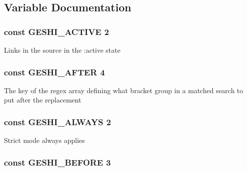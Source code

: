 \subsection{Variable Documentation}
\hypertarget{geshi_8php_a4d7a4c7dd9b37d0ad87e7f608aceb730}{
\subsubsection[{G\-E\-S\-H\-I\-\_\-\-A\-C\-T\-I\-V\-E}]{\setlength{\rightskip}{0pt plus 5cm}const G\-E\-S\-H\-I\-\_\-\-A\-C\-T\-I\-V\-E 2}}\label{geshi_8php_a4d7a4c7dd9b37d0ad87e7f608aceb730}
Links in the source in the \-:active state \hypertarget{geshi_8php_a9af1ed4c363ea643560ad9151f54d569}{
\subsubsection[{G\-E\-S\-H\-I\-\_\-\-A\-F\-T\-E\-R}]{\setlength{\rightskip}{0pt plus 5cm}const G\-E\-S\-H\-I\-\_\-\-A\-F\-T\-E\-R 4}}\label{geshi_8php_a9af1ed4c363ea643560ad9151f54d569}
The key of the regex array defining what bracket group in a matched search to put after the replacement \hypertarget{geshi_8php_ac99f8d1c5e483d980b3a5898e63c5ece}{
\subsubsection[{G\-E\-S\-H\-I\-\_\-\-A\-L\-W\-A\-Y\-S}]{\setlength{\rightskip}{0pt plus 5cm}const G\-E\-S\-H\-I\-\_\-\-A\-L\-W\-A\-Y\-S 2}}\label{geshi_8php_ac99f8d1c5e483d980b3a5898e63c5ece}
Strict mode always applies \hypertarget{geshi_8php_a4dcf8c272993a68180bc10566741f88b}{
\subsubsection[{G\-E\-S\-H\-I\-\_\-\-B\-E\-F\-O\-R\-E}]{\setlength{\rightskip}{0pt plus 5cm}const G\-E\-S\-H\-I\-\_\-\-B\-E\-F\-O\-R\-E 3}}\label{geshi_8php_a4dcf8c272993a68180bc10566741f88b}
